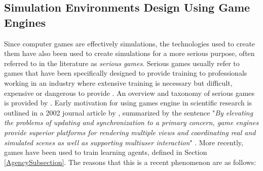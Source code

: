 \subsection{Simulation Environments Design Using Game Engines}\label{subsec:GameEngineReview}
Since computer games are effectively simulations, the technologies used to create them have also been used to create simulations for a more serious purpose, often referred to in the literature as \textit{serious games}. Serious games usually refer to games that have been specifically designed to provide training to professionals working in an industry where extensive training is necessary but difficult, expensive or dangerous to provide \cite{Sobke2016SeriousEngines}. An overview and taxonomy of serious games is provided by \citeauthor{Laamarti2014AnGames} \cite{Laamarti2014AnGames}. Early motivation for using games engine in scientific research is outlined in a 2002 journal article by \citeauthor{Lewis2002GameEnginesInScientificResearch}, summarized by the sentence "\textit{By elevating the problems of updating and synchronization to a primary concern, game engines provide superior platforms for rendering multiple views and coordinating real and simulated scenes as well as supporting multiuser interaction}" \cite{Lewis2002GameEnginesInScientificResearch}.  More recently, games have been used to train learning agents, defined in Section \ref{AgencySubsection}. The reasons that this is a recent phenomenon are as follows:
